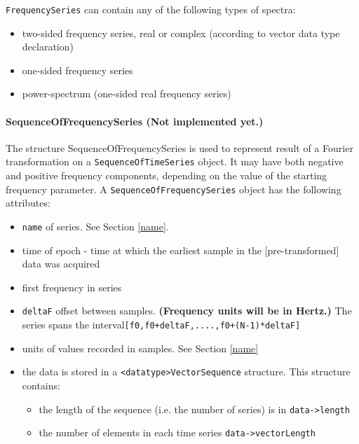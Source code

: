 \documentclass[]{ligodcc}
\renewcommand{\texttt}[1]{{\ttfamily\color{blue}#1}}
\begin{document}
\noindent
{\tt FrequencySeries} can contain any of the following types of spectra:
\begin{itemize}
\item
two-sided frequency series, real or complex (according to vector data
type declaration)
\vspace{-0.15in}
\item
one-sided frequency series
\vspace{-0.15in}
\item
power-spectrum (one-sided real frequency series)
\end{itemize}

\paragraph{{\texttt {SequenceOfFrequencySeries}} {\bf (Not implemented
yet.)} \\}

The structure SequenceOfFrequencySeries is used to represent result of
a Fourier transformation on a {\tt SequenceOfTimeSeries} object. It
may have both negative and positive frequency components, depending
on the value of the starting frequency parameter. A 
{\tt SequenceOfFrequencySeries} object has the following attributes:


\begin{itemize}
\vspace{-0.15in}
\item
{\tt name} of series. See Section \ref{name}.
\vspace{-0.15in}
\item
time of {epoch} - time at which the earliest sample in the
[pre-transformed] data was acquired
\vspace{-0.15in}
\item
first frequency in series
\vspace{-0.15in}
\item
{\tt deltaF} offset between samples.  {\bf (Frequency units will be in Hertz.)}
The series spans the interval{\tt [f0,f0+deltaF,....,f0+(N-1)*deltaF]}
\vspace{-0.15in}
\item
units of values recorded in samples. See Section \ref{name}
\vspace{-0.15in}
\item
the data is stored in a {\tt <datatype>VectorSequence}  structure. This structure contains:
\begin{itemize}
\vspace{-0.10in}
\item
the length of the sequence (i.e. the number of series) is  in {\tt data->length}
\vspace{-0.10in}
\item
 the number of elements in each time series {\tt data->vectorLength}
\end{itemize}
\end{itemize}
\end{document}
